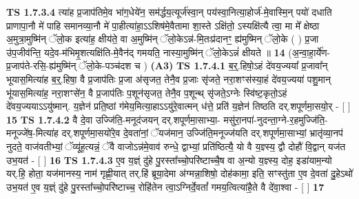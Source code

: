 \documentclass[17pt]{extarticle}
\begin{document}
                  \newline
                                \textbf{ TS 1.7.3.4} \newline
                  त्या॑ह प्र॒जाप॑तिमे॒व भा॑ग॒धेये॑न॒ सम॑र्द्धय॒त्यूर्ज॑स्वा॒न् पय॑स्वा॒नित्या॒होर्ज॑-मे॒वास्मि॒न् पयो॑ दधाति प्राणापा॒नौ मे॑ पाहि समानव्या॒नौ मे॑ पा॒हीत्या॑हा॒ऽऽशिष॑मे॒वैतामा शा॒स्ते ऽक्षि॑तो॒ ऽस्यक्षि॑त्यै त्वा॒ मा मे᳚ क्षेष्ठा अ॒मुत्रा॒मुष्मि॑न् ॅलो॒क इत्या॑ह॒ क्षीय॑ते॒ वा अ॒मुष्मि॑न् ॅलो॒केऽन्न॑-मि॒तःप्र॑दानꣳ॒॒ ह्य॑मुष्मिन् ॅलो॒के ( ) प्र॒जा उ॑प॒जीव॑न्ति॒ यदे॒व-म॑भिमृ॒शत्यक्षि॑ति-मे॒वैन॑द् गमयति॒ नास्या॒मुष्मि॑न् ॅलो॒केऽन्नं॑ क्षीयते ॥ \textbf{  14} \newline
                  \newline
                      (अ॒न्वा॒हा॒र्ये॑ण-प्र॒जाप॑ते-रसि॒-ह्य॑मुष्मि॑न् ॅलो॒के-पञ्च॑दश च )  \textbf{(A3)} \newline \newline
                                        \textbf{ TS 1.7.4.1} \newline
                  ब॒र्॒.हिषो॒ऽहं दे॑वय॒ज्यया᳚ प्र॒जावा᳚न् भूयास॒मित्या॑ह ब॒र्॒.हिषा॒ वै प्र॒जाप॑तिः प्र॒जा अ॑सृजत॒ तेनै॒व प्र॒जाः सृ॑जते॒ नरा॒शꣳस॑स्या॒हं दे॑वय॒ज्यया॑ पशु॒मान् भू॑यास॒मित्या॑ह॒ नरा॒शꣳसे॑न॒ वै प्र॒जाप॑तिः प॒शून॑सृजत॒ तेनै॒व प॒शून्थ् सृ॑जते॒ऽग्नेः स्वि॑ष्ट॒कृतो॒ऽहं दे॑वय॒ज्ययाऽऽयु॑ष्मान्. य॒ज्ञेन॑ प्रति॒ष्ठां ग॑मेय॒मित्या॒हाऽऽयु॑रे॒वात्मन् ध॑त्ते॒ प्रति॑ य॒ज्ञेन॑ तिष्ठति दर्.शपूर्णमा॒सयो॒र् - [ ] \textbf{  15} \newline
                  \newline
                                \textbf{ TS 1.7.4.2} \newline
                  वै दे॒वा उज्जि॑ति॒-मनूद॑जयन् दर्.शपूर्णमा॒साभ्या॒- मसु॑रा॒नपा॑-नुदन्ता॒ग्ने-र॒हमुज्जि॑ति॒-मनूज्जे॑ष॒-मित्या॑ह दर्.शपूर्णमा॒सयो॑रे॒व दे॒वता॑नां॒ ॅयज॑मान॒ उज्जि॑ति॒मनूज्ज॑यति दर्.शपूर्णमा॒साभ्यां॒ भ्रातृ॑व्या॒नप॑ नुदते॒ वाज॑वतीभ्यां॒ ॅव्यू॑ह॒त्यन्नं॒ ॅवै वाजोऽन्न॑मे॒वाव॑ रुन्धे॒ द्वाभ्यां॒ प्रति॑ष्ठित्यै॒ यो वै य॒ज्ञ्स्य॒ द्वौ दोहौ॑ वि॒द्वान् यज॑त उभ॒यत॑ - [ ] \textbf{  16} \newline
                  \newline
                                \textbf{ TS 1.7.4.3} \newline
                  ए॒व य॒ज्ञ्ं दु॑हे पु॒रस्ता᳚च्चो॒परि॑ष्टाच्चै॒ष वा अ॒न्यो य॒ज्ञ्स्य॒ दोह॒ इडा॑याम॒न्यो यर्.हि॒ होता॒ यज॑मानस्य॒ नाम॑ गृह्णी॒यात् तर्.हि॑ ब्रूया॒देमा अ॑ग्मन्ना॒शिषो॒ दोह॑कामा॒ इति॒ सꣳस्तु॑ता ए॒व दे॒वता॑ दु॒हेऽथो॑ उभ॒यत॑ ए॒व य॒ज्ञ्ं दु॑हे पु॒रस्ता᳚च्चो॒परि॑ष्टाच्च॒ रोहि॑तेन त्वा॒ऽग्निर्दे॒वतां᳚ गमय॒त्वित्या॑है॒ते वै दे॑वा॒श्वा - [ ] \textbf{  17} \newline
\end{document}
